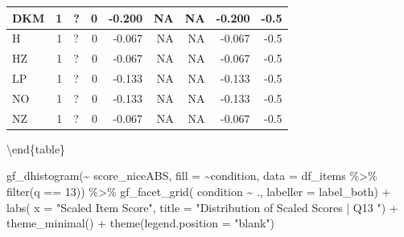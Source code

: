 \documentclass[
  letterpaper,
  DIV=11,
  numbers=noendperiod]{scrreprt}
\newenvironment{Shaded}{\begin{snugshade}}{\end{snugshade}}
\newcommand{\AttributeTok}[1]{\textcolor[rgb]{0.40,0.45,0.13}{#1}}
\newcommand{\DecValTok}[1]{\textcolor[rgb]{0.68,0.00,0.00}{#1}}
\newcommand{\FunctionTok}[1]{\textcolor[rgb]{0.28,0.35,0.67}{#1}}
\newcommand{\NormalTok}[1]{\textcolor[rgb]{0.00,0.23,0.31}{#1}}
\newcommand{\SpecialCharTok}[1]{\textcolor[rgb]{0.37,0.37,0.37}{#1}}
\newcommand{\StringTok}[1]{\textcolor[rgb]{0.13,0.47,0.30}{#1}}
\begin{document}
\begin{tabular}[t]{l|r|l|r|r|r|r|r|r}
\hline
\hspace{1em}DKM & 1 & ? & 0 & -0.200 & NA & NA & -0.200 & -0.5\\
\hline
\hspace{1em}H & 1 & ? & 0 & -0.067 & NA & NA & -0.067 & -0.5\\
\hline
\hspace{1em}HZ & 1 & ? & 0 & -0.067 & NA & NA & -0.067 & -0.5\\
\hline
\hspace{1em}LP & 1 & ? & 0 & -0.133 & NA & NA & -0.133 & -0.5\\
\hline
\hspace{1em}NO & 1 & ? & 0 & -0.133 & NA & NA & -0.133 & -0.5\\
\hline
\hspace{1em}NZ & 1 & ? & 0 & -0.067 & NA & NA & -0.067 & -0.5\\
\hline
\end{tabular}

\textbackslash end\{table\}

\begin{Shaded}
\begin{Highlighting}[]
\FunctionTok{gf\_dhistogram}\NormalTok{(}\SpecialCharTok{\textasciitilde{}}\NormalTok{ score\_niceABS, }\AttributeTok{fill =} \SpecialCharTok{\textasciitilde{}}\NormalTok{condition, }\AttributeTok{data =}\NormalTok{ df\_items }\SpecialCharTok{\%\textgreater{}\%} \FunctionTok{filter}\NormalTok{(q }\SpecialCharTok{==} \DecValTok{13}\NormalTok{)) }\SpecialCharTok{\%\textgreater{}\%} 
  \FunctionTok{gf\_facet\_grid}\NormalTok{( condition }\SpecialCharTok{\textasciitilde{}}\NormalTok{ ., }\AttributeTok{labeller =}\NormalTok{ label\_both) }\SpecialCharTok{+} 
  \FunctionTok{labs}\NormalTok{( }\AttributeTok{x =} \StringTok{"Scaled Item Score"}\NormalTok{, }\AttributeTok{title =} \StringTok{"Distribution of Scaled Scores | Q13 "}\NormalTok{) }\SpecialCharTok{+} 
  \FunctionTok{theme\_minimal}\NormalTok{() }\SpecialCharTok{+} \FunctionTok{theme}\NormalTok{(}\AttributeTok{legend.position =} \StringTok{"blank"}\NormalTok{)}
\end{Highlighting}
\end{Shaded}
\end{document}
